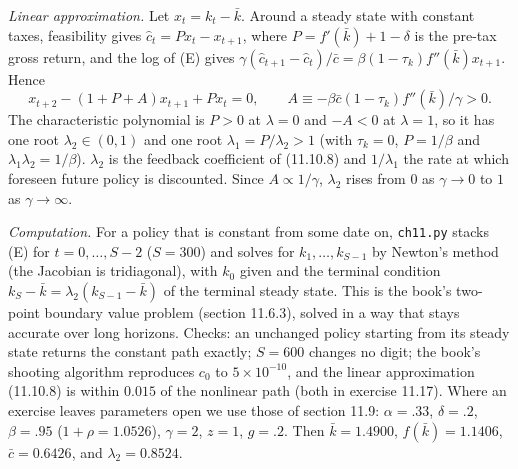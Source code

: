 \documentclass[11pt,letterpaper,reqno]{amsart}
\newcommand{\bk}[1]{\textup{\textsc{#1}}}
\begin{document}
\emph{Linear approximation.}  Let $x_t=k_t-\bar k$.  Around a steady state with constant taxes, feasibility gives $\hat c_t=Px_t-x_{t+1}$, where
$P=f'(\bar k)+1-\delta$ is the pre-tax gross return, and the log of (E) gives $\gamma(\hat c_{t+1}-\hat c_t)/\bar c=\beta(1-\tau_k)f''(\bar k)x_{t+1}$.  Hence
\[
  x_{t+2}-(1+P+A)x_{t+1}+Px_t=0,\qquad A\equiv-\beta\bar c(1-\tau_k)f''(\bar k)/\gamma>0 .
\]
The characteristic polynomial is $P>0$ at $\lambda=0$ and $-A<0$ at $\lambda=1$, so it has one root $\lambda_2\in(0,1)$ and one root $\lambda_1=P/\lambda_2>1$ (with
$\tau_k=0$, $P=1/\beta$ and $\lambda_1\lambda_2=1/\beta$).  $\lambda_2$ is the feedback coefficient of \bk{(11.10.8)} and $1/\lambda_1$ the rate at which
foreseen future policy is discounted.  Since $A\propto1/\gamma$, $\lambda_2$ rises from $0$ as $\gamma\to0$ to $1$ as $\gamma\to\infty$.

\emph{Computation.}  For a policy that is constant from some date on, \texttt{ch11.py} stacks (E) for $t=0,\dots,S-2$ ($S=300$) and solves for
$k_1,\dots,k_{S-1}$ by Newton's method (the Jacobian is tridiagonal), with $k_0$ given and the terminal condition $k_S-\bar k=\lambda_2(k_{S-1}-\bar k)$ of the
terminal steady state.  This is the book's two-point boundary value problem (section \bk{11.6.3}), solved in a way that stays accurate over long
horizons.  Checks: an unchanged policy starting from its steady state returns the constant path exactly; $S=600$ changes no digit; the book's shooting
algorithm reproduces $c_0$ to $5\times10^{-10}$, and the linear approximation \bk{(11.10.8)} is within $0.015$ of the nonlinear path (both in exercise 11.17).
Where an exercise leaves parameters open we use those of section \bk{11.9}: $\alpha=.33$, $\delta=.2$, $\beta=.95$ ($1+\rho=1.0526$), $\gamma=2$, $z=1$,
$g=.2$.  Then $\bar k=1.4900$, $f(\bar k)=1.1406$, $\bar c=0.6426$, and $\lambda_2=0.8524$.
\end{document}
